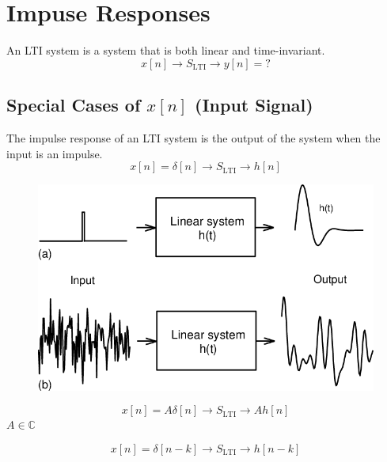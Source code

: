 \chapter{Impuse Responses}

\begin{theorem}
    An LTI system is a system that is both linear and time-invariant.
    $$x[n] \rightarrow \boxed{S_\text{LTI}} \rightarrow y[n] = ?$$
\end{theorem}

\section{Special Cases of $x[n]$ (Input Signal)}

\begin{definition}
    The impulse response of an LTI system is the output of the system when the input is an impulse.
    $$x[n] = \delta[n] \rightarrow \boxed{S_\text{LTI}} \rightarrow h[n]$$
\end{definition}

\begin{figure}
    \centering
    \includegraphics{LECTURE_11/LTI.png}
\end{figure}

\begin{definition}
    $$ x[n] = A\delta [n] \rightarrow \boxed{S_\text{LTI}} \rightarrow Ah[n]$$
    $A \in \mathbb{C}$
\end{definition}

\begin{definition}
    $$x[n] = \delta[n-k] \rightarrow \boxed{S_\text{LTI}} \rightarrow h[n-k]$$
\end{definition}

